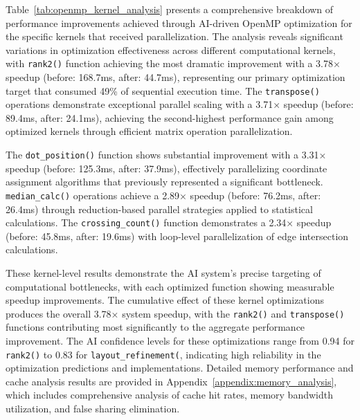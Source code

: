 Table~\ref{tab:openmp_kernel_analysis} presents a comprehensive breakdown of performance improvements achieved through AI-driven OpenMP optimization for the specific kernels that received parallelization. The analysis reveals significant variations in optimization effectiveness across different computational kernels, with \texttt{rank2()} function achieving the most dramatic improvement with a 3.78× speedup (before: 168.7ms, after: 44.7ms), representing our primary optimization target that consumed 49\% of sequential execution time. The \texttt{transpose()} operations demonstrate exceptional parallel scaling with a 3.71× speedup (before: 89.4ms, after: 24.1ms), achieving the second-highest performance gain among optimized kernels through efficient matrix operation parallelization.

The \texttt{dot\_position()} function shows substantial improvement with a 3.31× speedup (before: 125.3ms, after: 37.9ms), effectively parallelizing coordinate assignment algorithms that previously represented a significant bottleneck. \texttt{median\_calc()} operations achieve a 2.89× speedup (before: 76.2ms, after: 26.4ms) through reduction-based parallel strategies applied to statistical calculations. The \texttt{crossing\_count()} function demonstrates a 2.34× speedup (before: 45.8ms, after: 19.6ms) with loop-level parallelization of edge intersection calculations. %

These kernel-level results demonstrate the AI system's precise targeting of computational bottlenecks, with each optimized function showing measurable speedup improvements. The cumulative effect of these kernel optimizations produces the overall 3.78× system speedup, with the \texttt{rank2()} and \texttt{transpose()} functions contributing most significantly to the aggregate performance improvement. The AI confidence levels for these optimizations range from 0.94 for \texttt{rank2()} to 0.83 for \texttt{layout\_refinement(}, indicating high reliability in the optimization predictions and implementations.
Detailed memory performance and cache analysis results are provided in Appendix~\ref{appendix:memory_analysis}, which includes comprehensive analysis of cache hit rates, memory bandwidth utilization, and false sharing elimination.

